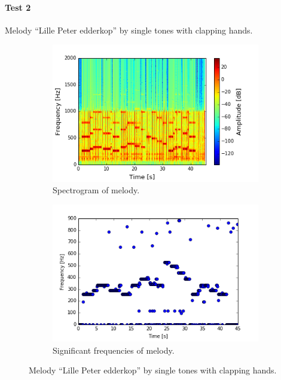 \paragraph{Test 2} Melody ``Lille Peter edderkop'' by single tones with clapping hands.  
\begin{figure}[H]
\centering
\begin{subfigure}{0.49\textwidth}
\centering
\includegraphics[width=\textwidth]{figures/validation/systemtest/final_spec2.png}
\caption{Spectrogram of melody.}
\label{fig:final_spec2}
\end{subfigure}
\begin{subfigure}{0.49\textwidth}
\centering
\includegraphics[width=\textwidth]{figures/validation/systemtest/final_peak2.png}
\caption{Significant frequencies of melody.}
\label{fig:final_peak3}
\end{subfigure}
\caption{Melody ``Lille Peter edderkop'' by single tones with clapping hands.}
\label{fig:final_3}
\end{figure}  

